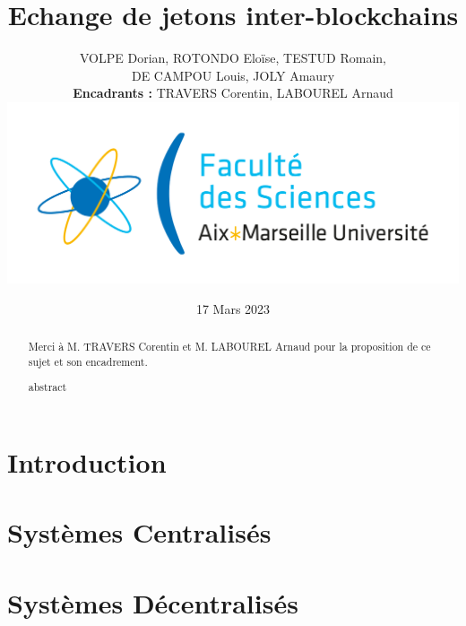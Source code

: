 \documentclass{article}
\newenvironment*{remerciements}{%
  \renewcommand*{\abstractname}{Remerciements}
  \begin{abstract}
}{
  \end{abstract}
}
\begin{document}
\title{Echange de jetons inter-blockchains}
\author{VOLPE Dorian, ROTONDO Eloïse, TESTUD Romain,\\DE CAMPOU Louis, JOLY Amaury  \\ \textbf{Encadrants :} TRAVERS Corentin, LABOUREL Arnaud \\ \includegraphics[scale=0.1]{./img/amu.png}}
\date{17 Mars 2023}

\begin{titlepage}
  \maketitle
\end{titlepage}

\begin{remerciements}
  Merci à M. TRAVERS Corentin et M. LABOUREL Arnaud pour la proposition de ce sujet et son encadrement.
\end{remerciements}
\begin{abstract}
  abstract
\end{abstract}

\newpage

\tableofcontents

\newpage

\section{Introduction}


\section{Systèmes Centralisés}


\section{Systèmes Décentralisés}


\printbibliography
\end{document}
